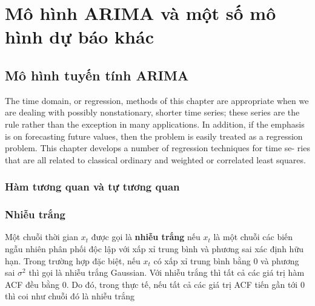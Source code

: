 \documentclass[twoside,12pt]{Latex/Classes/PhDthesisPSnPDF}
\begin{document}
\chapter{Mô hình ARIMA và một số mô hình dự báo khác}
\section{Mô hình tuyến tính ARIMA}

The time domain, or
regression, methods of this chapter are appropriate when we are dealing with
possibly nonstationary, shorter time series; these series are the rule rather
than the exception in many applications. In addition, if the emphasis is on
forecasting future values, then the problem is easily treated as a regression
problem. This chapter develops a number of regression techniques for time se-
ries that are all related to classical ordinary and weighted or correlated least
squares.
\subsection{Hàm tương quan và tự tương quan}

	
\subsection{Nhiễu trắng}
Một chuỗi thời gian $x_t$ được gọi là \textbf{nhiễu trắng} nếu $x_t$ là một chuỗi các biến ngẫu nhiên phân phối độc lập với xấp xỉ trung bình và phương sai xác định hữu hạn. Trong trường hợp đặc biệt, nếu $x_t$ có xấp xỉ trung bình bằng $0$ và phương sai $\sigma^2$ thì gọi là nhiễu trắng Gaussian. Với nhiễu trắng thì tất cả các giá trị hàm ACF đều bằng $0$. Do đó, trong thực tế, nếu tất cả các giá trị ACF tiến gần tới $0$ thì coi như chuỗi đó là nhiễu trắng
\end{document}
